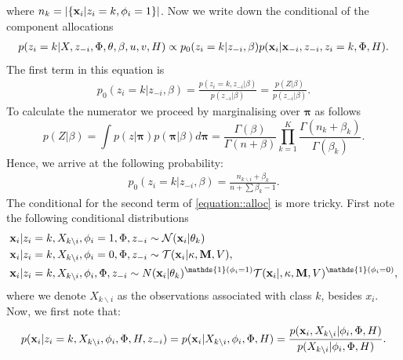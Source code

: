 \documentclass[12pt,english]{article}\usepackage[]{graphicx}\usepackage[]{color}
\begin{document}
where $n_k = \lvert\{{\bf x}_i|z_i=k, \phi_i = 1\}\rvert$.
Now we write down the conditional of the component allocations
\begin{equation} \label{equation::alloc}
\begin{split}
p(z_i = k|X,z_{-i},\Phi, \theta, \beta, u,v, H) \propto p_0(z_i = k|z_{-i},\beta)p({\bf x}_i|{\bf x}_{-i},z_{-i}, z_i = k,\Phi, H).
\end{split}
\end{equation}
The first term in this equation is
\begin{equation}
\begin{split}
 p_0(z_i = k|z_{-i},\beta) = \frac{p(z_i = k, z_{-i}|\beta)}{p(z_{-i}|\beta)} = \frac{p(Z|\beta)}{p(z_{-i}|\beta)}.
\end{split}
\end{equation}
To calculate the numerator we proceed by marginalising over $\boldsymbol{\pi}$ as follows
\begin{equation}
p(Z|\beta) = \int p(z|\boldsymbol{\pi})p(\boldsymbol{\pi}|\beta) d\boldsymbol{\pi} = \frac{\Gamma(\beta)}{\Gamma(n + \beta)}\prod_{k=1}^{K}\frac{\Gamma(n_k + \beta_k)}{\Gamma(\beta_k)}.
\end{equation}
Hence, we arrive at the following probability:
\begin{equation}
\begin{split}
p_0(z_i = k|z_{-i},\beta) = \frac{n_{k \backslash i} + \beta_k}{n + \sum \beta_k - 1}.
\end{split}
\end{equation}
The conditional for the second term of \ref{equation::alloc} is more tricky. First note the following conditional distributions
\begin{equation}
\begin{split}
{\bf x}_i |& z_i = k, X_{k\backslash i}, \phi_i = 1, \Phi, z_{-i} \sim \mathcal{N}({\bf x}_i|\theta_{k})\\
{\bf x}_i |& z_i = k, X_{k\backslash i}, \phi_i = 0, \Phi, z_{-i} \sim \mathcal{T}({\bf x}_i|\kappa, {\bf M},V), \\
{\bf x}_i |& z_i = k, X_{k\backslash i}, \phi_i, \Phi, z_{-i}\sim N({\bf x}_i|\theta_{k})^{\mathds{1}(\phi_i=1)}\mathcal{T}({\bf x}_i|,\kappa,{\bf M},V)^{\mathds{1}(\phi_i=0)}, \\
\end{split}
\end{equation}
where we denote $X_{k\backslash i}$ as the observations associated with class $k$, besides $x_i$. Now, we first note that:
\begin{equation}\label{equation::predicitve}
\begin{split}
p({\bf x}_i| z_i = k, X_{k\backslash i}, \phi_i, \Phi, H, z_{-i}) =  p({\bf x}_i|X_{k\backslash i}, \phi_i, \Phi, H) = \frac{p({\bf x}_i, X_{k\backslash i}|\phi_i, \Phi, H)}{p(X_{k\backslash i}|\phi_i, \Phi, H)}.
\end{split}
\end{equation}
\end{document}
